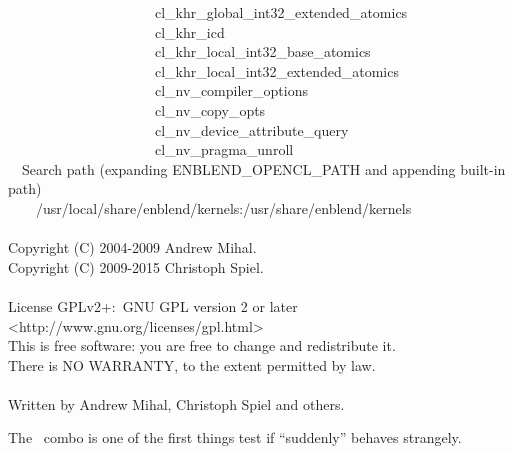 \begin{exemplar}
\begin{maxipage}
\begin{terminal}
        ~~~~~~~~~~~~~~~~~~~~~cl\_khr\_global\_int32\_extended\_atomics \\
        ~~~~~~~~~~~~~~~~~~~~~cl\_khr\_icd \\
        ~~~~~~~~~~~~~~~~~~~~~cl\_khr\_local\_int32\_base\_atomics \\
        ~~~~~~~~~~~~~~~~~~~~~cl\_khr\_local\_int32\_extended\_atomics \\
        ~~~~~~~~~~~~~~~~~~~~~cl\_nv\_compiler\_options \\
        ~~~~~~~~~~~~~~~~~~~~~cl\_nv\_copy\_opts \\
        ~~~~~~~~~~~~~~~~~~~~~cl\_nv\_device\_attribute\_query \\
        ~~~~~~~~~~~~~~~~~~~~~cl\_nv\_pragma\_unroll \\
        ~~Search path (expanding ENBLEND\_OPENCL\_PATH and appending built-in path) \\
        ~~~~/usr/local/share/enblend/kernels:/usr/share/enblend/kernels \\
        ~ \\
        Copyright (C) 2004-2009 Andrew Mihal. \\
        Copyright (C) 2009-2015 Christoph Spiel. \\
        ~ \\
        License GPLv2+:~GNU GPL version 2 or later <http://www.gnu.org/licenses/gpl.html> \\
        This is free software: you are free to change and redistribute it. \\
        There is NO WARRANTY, to the extent permitted by law. \\
        ~ \\
        Written by Andrew Mihal, Christoph Spiel and others.
    \end{terminal}
  \end{maxipage}

  \caption[Output of ]%
          {\label{ex:option-version-verbose}%
            Example output of \appcmd{} when called with options 
            and~ together.}
\end{exemplar}

The ~combo is one of the first things test if \appcmd{} ``suddenly''
behaves strangely.


